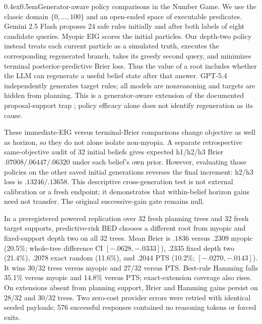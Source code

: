 \documentclass[10pt]{article}
\makeatletter
\renewcommand\paragraph{\@startsection{paragraph}{4}{0pt}%
  {0.4ex}{0.5em}{\normalfont\normalsize\bfseries}}
\makeatother
\begin{document}
\paragraph{Generator-aware policy comparisons in the Number Game.}
We use the classic domain $\{0,\ldots,100\}$ and an open-ended space of
executable predicates. Gemini 2.5 Flash proposes 24 safe rules initially and
after both labels of eight candidate queries. Myopic EIG scores the initial
particles. Our depth-two policy instead treats each current particle as a
simulated truth, executes the corresponding regenerated branch, takes its
greedy second query, and minimizes terminal posterior-predictive Brier loss.
Thus the value of a root includes whether the LLM can regenerate a useful
belief state after that answer. GPT-5.4 independently generates target rules;
all models are nonreasoning and targets are hidden from planning. This is a
generator-aware extension of the documented proposal-support trap
\citep{chari2026wild}; policy efficacy alone does not identify regeneration as
its cause.

These immediate-EIG versus terminal-Brier comparisons change objective as well
as horizon, so they do not alone isolate non-myopia. A separate retrospective
same-objective audit of 32 initial beliefs gives expected h1/h2/h3 Brier
$.07008/.06447/.06320$ under each belief's own prior. However, evaluating those
policies on the other saved initial generations reverses the final increment:
h2/h3 loss is $.13246/.13658$. This descriptive cross-generation test is not
external calibration or a fresh endpoint; it demonstrates that within-belief
horizon gains need not transfer. The original successive-gain gate remains null.

In a preregistered powered replication over 32 fresh planning trees and 32
fresh target supports, predictive-risk BED chooses a different root from
myopic and fixed-support depth two on all 32 trees. Mean Brier is $.1836$
versus $.2309$ myopic (20.5\%; whole-tree difference CI
$[-.0628,-.0333]$), $.2335$ fixed depth two (21.4\%), $.2078$ exact random
(11.6\%), and $.2044$ PTS (10.2\%; $[-.0270,-.0143]$). It wins 30/32
trees versus myopic and 27/32 versus PTS. Best-rule Hamming falls 35.1\%
versus myopic and 14.8\% versus PTS; exact-extension coverage also rises.
On extensions absent from planning support, Brier and Hamming gains persist
on 28/32 and 30/32 trees. Two zero-cost provider errors were retried with
identical seeded payloads; 576 successful responses contained no reasoning
tokens or forced exits.
\end{document}
